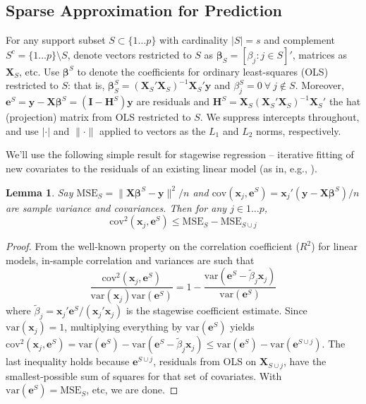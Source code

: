\documentclass[12pt]{article}
\newtheorem{lemma}{\sc Lemma}[section]
\newcommand{\bs}[1]{\boldsymbol{#1}}
\newcommand{\mr}[1]{\mathrm{#1}}
\newcommand{\bm}[1]{\mathbf{#1}}
\begin{document}
\subsection{Sparse Approximation for Prediction}

 For any support subset $S \subset \{1\ldots p\}$ with cardinality $|S|=s$ and
complement $S^c = \{1\ldots p\}\setminus S$, denote vectors restricted to $S$
as $\bm{\beta}_S = [\beta_j:j\in S]'$, matrices as $\bm{X}_S$, etc.  Use
$\bs{\beta}^S$ to denote the coefficients for ordinary
least-squares (OLS) restricted to $S$: that is, $\bs{\beta}^S_S =
(\bm{X}_S'\bm{X}_S)^{-1}\bm{X}_S'\bm{y}$ and $\beta^{S}_j = 0~\forall~j\notin
S$.  Moreover, $\bm{e}^S = \bm{y}-\bm{X}\bs{\beta}^S =
(\bm{I}-\bm{H}^S)\bm{y}$ are residuals and $\bm{H}^S =
\bm{X}_S(\bm{X}_S'\bm{X}_S)^{-1}\bm{X}_S'$ the hat (projection) matrix from OLS restricted to $S$.  We suppress intercepts throughout, and use $|\cdot|$ and $\|\cdot\|$ applied to vectors as the $L_1$ and $L_2$ norms, respectively.

We'll use the following simple result for stagewise regression -- iterative fitting of new covariates to the residuals of an existing linear model (as in, e.g., \citealt{goldberger_stepwise_1961}). 
\begin{lemma}\label{SSElemma}
Say $\mr{MSE}_S = \|\bm{X}\bs{\beta}^S-\bm{y}\|^2/n$ and 
$\mr{cov}(\bs{x}_j,\bm{e}^S) = \bs{x}_j'(\bm{y}-\bm{X}\bs{\beta}^S)/n$ are sample variance and covariances.  Then for any $j \in 1\ldots p$, 
\[
\mr{cov}^2(\bs{x}_j,\bm{e}^S) \leq \mr{MSE}_S - \mr{MSE}_{S\cup j}
\]
\end{lemma}
\begin{proof}
From the well-known property on the correlation coefficient ($R^2$) for linear models,   
in-sample correlation and variances are such that
\[
\frac{\mr{cov}^2(\bs{x}_j,\bm{e}^S)}{\mr{var}(\bs{x}_j)\mr{var}(\bm{e}^S)} = 1 - \frac{\mr{var}(\bm{e}^S-\tilde\beta_j\bs{x}_j)}{\mr{var}(\bm{e}^S)}
\]
where $\tilde\beta_j = \bs{x}_j'\bm{e}^S/(\bs{x}_j'\bs{x}_j)$ is the stagewise coefficient estimate.  Since $\mr{var}(\bs{x}_j)=1$, multiplying everything by $\mr{var}(\bm{e}^S)$ yields $\mr{cov}^2(\bs{x}_j,\bm{e}^S) =
\mr{var}(\bm{e}^S) - \mr{var}(\bm{e}^S-\tilde\beta_j\bs{x}_j)
\leq \mr{var}(\bm{e}^S) - \mr{var}(\bm{e}^{S\cup j})$.
The last inequality holds because $\bm{e}^{S\cup j}$, residuals from OLS on $\bm{X}_{S\cup j}$, have the smallest-possible sum of squares for that set of covariates.  With $\mr{var}(\bm{e}^S) = \mr{MSE}_S$, etc, we are done.
\end{proof}
\end{document}
